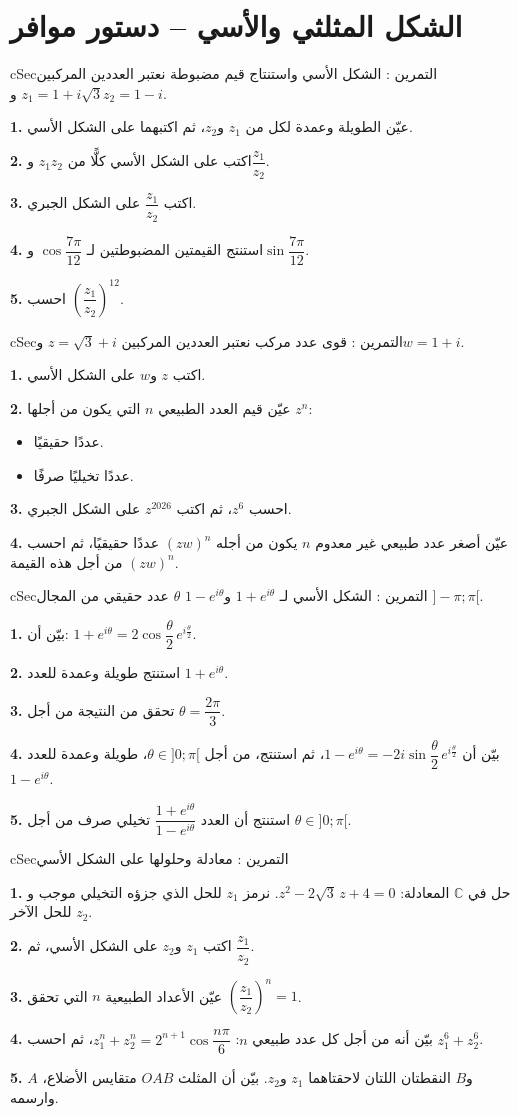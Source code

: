 \documentclass[12pt,a4paper]{article}
\newenvironment{BOX}[2]{\begin{otherlanguage}{english}\begin{arbox}{#1}{#2}}{\end{arbox}\end{otherlanguage}}
\newcounter{exo}
\newenvironment{tamrin}[1]{\stepcounter{exo}\begin{BOX}{cSec}{التمرين \theexo: #1}}{\end{BOX}}
\newenvironment{sq}{\begin{itemize}[leftmargin=2.4em,itemsep=3pt]}{\end{itemize}}
\newcommand{\qa}{\item[(أ)]}\newcommand{\qb}{\item[(ب)]}\newcommand{\qc}{\item[(جـ)]}\newcommand{\qd}{\item[(د)]}\newcommand{\qe}{\item[(هـ)]}
\newcommand{\QQ}[1]{\par\smallskip\textbf{#1.} }
\begin{document}
\section{الشكل المثلثي والأسي -- دستور موافر}

\begin{tamrin}{الشكل الأسي واستنتاج قيم مضبوطة}
نعتبر العددين المركبين $z_1=1+i\sqrt3$ و$z_2=1-i$.
\QQ{1} عيّن الطويلة وعمدة لكل من $z_1$ و$z_2$، ثم اكتبهما على الشكل الأسي.
\QQ{2} اكتب على الشكل الأسي كلًّا من $z_1z_2$ و$\dfrac{z_1}{z_2}$.
\QQ{3} اكتب $\dfrac{z_1}{z_2}$ على الشكل الجبري.
\QQ{4} استنتج القيمتين المضبوطتين لـ $\cos\dfrac{7\pi}{12}$ و$\sin\dfrac{7\pi}{12}$.
\QQ{5} احسب $\left(\dfrac{z_1}{z_2}\right)^{12}$.
\end{tamrin}

\begin{tamrin}{قوى عدد مركب}
نعتبر العددين المركبين $z=\sqrt3+i$ و$w=1+i$.
\QQ{1} اكتب $z$ و$w$ على الشكل الأسي.
\QQ{2} عيّن قيم العدد الطبيعي $n$ التي يكون من أجلها $z^n$:
\begin{sq}
\qa عددًا حقيقيًا.
\qb عددًا تخيليًا صرفًا.
\end{sq}
\QQ{3} احسب $z^6$، ثم اكتب $z^{2026}$ على الشكل الجبري.
\QQ{4} عيّن أصغر عدد طبيعي غير معدوم $n$ يكون من أجله $(zw)^n$ عددًا حقيقيًا، ثم احسب $(zw)^n$ من أجل هذه القيمة.
\end{tamrin}

\begin{tamrin}{الشكل الأسي لـ $1+e^{i\theta}$ و$1-e^{i\theta}$}
$\theta$ عدد حقيقي من المجال $]-\pi;\pi[$.
\QQ{1} بيّن أن: $1+e^{i\theta}=2\cos\dfrac\theta2\,e^{i\frac\theta2}$.
\QQ{2} استنتج طويلة وعمدة للعدد $1+e^{i\theta}$.
\QQ{3} تحقق من النتيجة من أجل $\theta=\dfrac{2\pi}{3}$.
\QQ{4} بيّن أن $1-e^{i\theta}=-2i\sin\dfrac\theta2\,e^{i\frac\theta2}$، ثم استنتج، من أجل $\theta\in]0;\pi[$، طويلة وعمدة للعدد $1-e^{i\theta}$.
\QQ{5} استنتج أن العدد $\dfrac{1+e^{i\theta}}{1-e^{i\theta}}$ تخيلي صرف من أجل $\theta\in]0;\pi[$.
\end{tamrin}

\begin{tamrin}{معادلة وحلولها على الشكل الأسي}
\QQ{1} حل في $\mathbb{C}$ المعادلة: $z^2-2\sqrt3\,z+4=0$. نرمز $z_1$ للحل الذي جزؤه التخيلي موجب و$z_2$ للحل الآخر.
\QQ{2} اكتب $z_1$ و$z_2$ على الشكل الأسي، ثم $\dfrac{z_1}{z_2}$.
\QQ{3} عيّن الأعداد الطبيعية $n$ التي تحقق $\left(\dfrac{z_1}{z_2}\right)^n=1$.
\QQ{4} بيّن أنه من أجل كل عدد طبيعي $n$: $z_1^n+z_2^n=2^{n+1}\cos\dfrac{n\pi}{6}$، ثم احسب $z_1^6+z_2^6$.
\QQ{5} $A$ و$B$ النقطتان اللتان لاحقتاهما $z_1$ و$z_2$. بيّن أن المثلث $OAB$ متقايس الأضلاع، وارسمه.
\end{tamrin}
\end{document}
